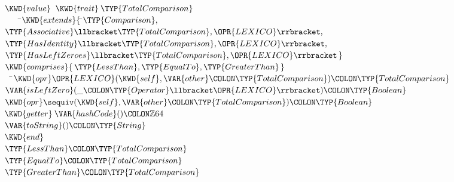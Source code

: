\begin{Fortress}
\(\KWD{value}\;\;\KWD{trait}\:\TYP{TotalComparison}\)\\
{\tt~~~~}\pushtabs\=\+\(    \KWD{extends} \{\, \null\)\pushtabs\=\+\(\TYP{Comparison},\)\\
\(              \TYP{Associative}\llbracket\TYP{TotalComparison},\OPR{LEXICO}\rrbracket,\)\\
\(              \TYP{HasIdentity}\llbracket\TYP{TotalComparison},\OPR{LEXICO}\rrbracket,\)\\
\(              \TYP{HasLeftZeroes}\llbracket\TYP{TotalComparison},\OPR{LEXICO}\rrbracket\,\}\)\-\\\poptabs
\(    \KWD{comprises} \{\,\TYP{LessThan}, \TYP{EqualTo}, \TYP{GreaterThan}\,\}\)\-\\\poptabs
{\tt~~}\pushtabs\=\+\(  \KWD{opr} \mathord{\OPR{LEXICO}}(\KWD{self}, \VAR{other}\COLON \TYP{TotalComparison})\COLON \TYP{TotalComparison}\)\\
\(  \VAR{isLeftZero}(\_\COLON \TYP{Operator}\llbracket\OPR{LEXICO}\rrbracket)\COLON \TYP{Boolean}\)\\
\(  \KWD{opr} \mathord{\sequiv}(\KWD{self}, \VAR{other}\COLON \TYP{TotalComparison})\COLON \TYP{Boolean}\)\\
\(  \KWD{getter}\:\VAR{hashCode}()\COLON \mathbb{Z}64\)\\
\(  \VAR{toString}()\COLON \TYP{String}\)\-\\\poptabs
\(\KWD{end}\)\\[4pt]
\(\TYP{LessThan}\COLON \TYP{TotalComparison}\)\\
\(\TYP{EqualTo}\COLON \TYP{TotalComparison}\)\\
\(\TYP{GreaterThan}\COLON \TYP{TotalComparison}\)
\end{Fortress}




